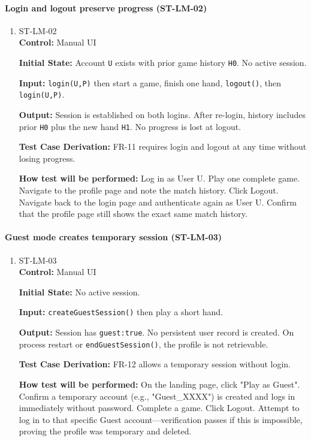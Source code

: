 \documentclass[12pt, titlepage]{article}
\begin{document}
\paragraph{Login and logout preserve progress (ST-LM-02)}
\begin{enumerate}
\item{ST-LM-02\\}
\textbf{Control:} Manual UI

\textbf{Initial State:} Account \texttt{U} exists with prior game history \texttt{H0}. No active session.

\textbf{Input:} \texttt{login(U,P)} then start a game, finish one hand, \texttt{logout()}, then \texttt{login(U,P)}.

\textbf{Output:} Session is established on both logins. After re-login, history includes prior \texttt{H0} plus the new hand \texttt{H1}. No progress is lost at logout.

\textbf{Test Case Derivation:} FR-11 requires login and logout at any time without losing progress.

\textbf{How test will be performed:} Log in as User U. Play one complete game. Navigate to the profile page and note the match history. Click Logout. Navigate back to the login page and authenticate again as User U. Confirm that the profile page still shows the exact same match history.
\end{enumerate}

\paragraph{Guest mode creates temporary session (ST-LM-03)}
\begin{enumerate}
\item{ST-LM-03\\}
\textbf{Control:} Manual UI

\textbf{Initial State:} No active session.

\textbf{Input:} \texttt{createGuestSession()} then play a short hand.

\textbf{Output:} Session has \texttt{guest:true}. No persistent user record is created. On process restart or \texttt{endGuestSession()}, the profile is not retrievable.

\textbf{Test Case Derivation:} FR-12 allows a temporary session without login.

\textbf{How test will be performed:} On the landing page, click "Play as Guest". Confirm a temporary account (e.g., "Guest\_XXXX") is created and logs in immediately without password. Complete a game. Click Logout. Attempt to log in to that specific Guest account—verification passes if this is impossible, proving the profile was temporary and deleted.
\end{enumerate}
\end{document}
